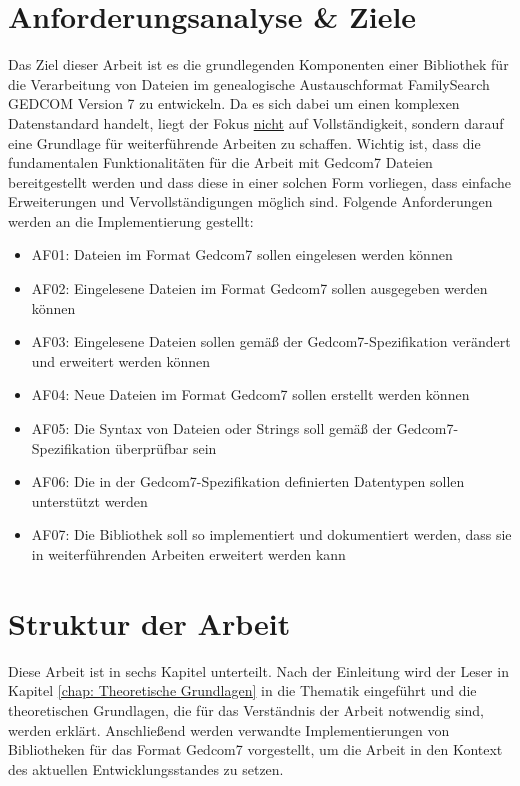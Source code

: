 \section{Anforderungsanalyse \& Ziele}
\label{sec: Anforderungsanalyse und Ziele}
Das Ziel dieser Arbeit ist es die grundlegenden Komponenten einer Bibliothek für die Verarbeitung von Dateien im genealogische Austauschformat FamilySearch GEDCOM Version 7 zu entwickeln. Da es sich dabei um einen komplexen Datenstandard handelt, liegt der Fokus \underline{nicht} auf Vollständigkeit, sondern darauf eine Grundlage für weiterführende Arbeiten zu schaffen. Wichtig ist, dass die fundamentalen Funktionalitäten für die Arbeit mit Gedcom7 Dateien bereitgestellt werden und dass diese in einer solchen Form vorliegen, dass einfache Erweiterungen und Vervollständigungen möglich sind. 
\newpage
{\noindent Folgende Anforderungen werden an die Implementierung gestellt:}
\begin{itemize}
	\item AF01: Dateien im Format Gedcom7 sollen eingelesen werden können
	\item AF02: Eingelesene Dateien im  Format Gedcom7 sollen ausgegeben werden können
	\item AF03: Eingelesene Dateien sollen gemäß der Gedcom7-Spezifikation verändert und erweitert werden können
	\item AF04: Neue Dateien im Format Gedcom7 sollen erstellt werden können
	\item AF05: Die Syntax von Dateien oder Strings soll gemäß der Gedcom7-Spezifikation überprüfbar sein 
	\item AF06: Die in der Gedcom7-Spezifikation definierten Datentypen sollen unterstützt werden 
	\item AF07: Die Bibliothek soll so implementiert und dokumentiert werden, dass sie in weiterführenden Arbeiten erweitert werden kann
\end{itemize}

\section{Struktur der Arbeit}
\label{sec: Struktur der Arbeit}
Diese Arbeit ist in sechs Kapitel unterteilt. Nach der Einleitung wird der Leser in Kapitel \ref{chap: Theoretische Grundlagen} in die Thematik eingeführt und die theoretischen Grundlagen, die für das Verständnis der Arbeit notwendig sind, werden erklärt. Anschließend werden verwandte Implementierungen von Bibliotheken für das Format Gedcom7 vorgestellt, um die Arbeit in den Kontext des aktuellen Entwicklungsstandes zu setzen. 


